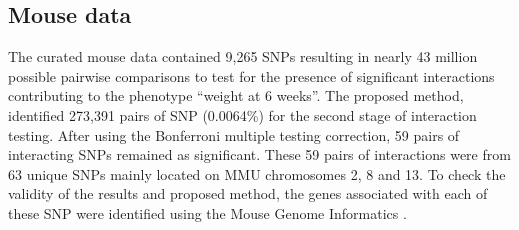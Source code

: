 \documentclass[preprint,12pt,3p]{elsarticle}
\begin{document}
\subsection{Mouse  data}
The curated mouse data contained 9,265 SNPs resulting in nearly 43 million possible pairwise comparisons to test for the
presence of significant interactions contributing to the phenotype ``weight at 6 weeks''. The proposed method, identified
273,391 pairs of SNP (0.0064\%) for the second stage of interaction testing. After using the Bonferroni multiple testing
correction, 59 pairs of interacting SNPs remained as significant. These 59 pairs of interactions were from 63 unique
SNPs mainly located on MMU chromosomes 2, 8 and 13. To check the validity of the results and proposed method, the genes
associated with each of these SNP were identified using the Mouse Genome Informatics \cite[]{mgi}.
\end{document}
